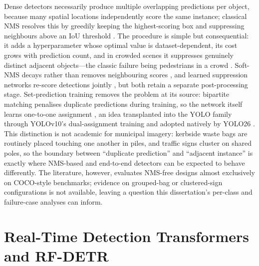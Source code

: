 Dense detectors necessarily produce multiple overlapping predictions per object, because many spatial locations independently score the same instance; classical NMS resolves this by greedily keeping the highest-scoring box and suppressing neighbours above an IoU threshold \citep{neubeck2006efficient}. The procedure is simple but consequential: it adds a hyperparameter whose optimal value is dataset-dependent, its cost grows with prediction count, and in crowded scenes it suppresses genuinely distinct adjacent objects---the classic failure being pedestrians in a crowd \citep{bodla2017soft}. Soft-NMS decays rather than removes neighbouring scores \citep{bodla2017soft}, and learned suppression networks re-score detections jointly \citep{hosang2017learning}, but both retain a separate post-processing stage. Set-prediction training removes the problem at its source: bipartite matching penalises duplicate predictions during training, so the network itself learns one-to-one assignment \citep{carion2020end}, an idea transplanted into the YOLO family through YOLOv10's dual-assignment training \citep{wang2024yolov10} and adopted natively by YOLO26 \citep{jocher2026yolo26}. This distinction is not academic for municipal imagery: kerbside waste bags are routinely placed touching one another in piles, and traffic signs cluster on shared poles, so the boundary between ``duplicate prediction'' and ``adjacent instance'' is exactly where NMS-based and end-to-end detectors can be expected to behave differently. The literature, however, evaluates NMS-free designs almost exclusively on COCO-style benchmarks; evidence on grouped-bag or clustered-sign configurations is not available, leaving a question this dissertation's per-class and failure-case analyses can inform.

\section{Real-Time Detection Transformers and RF-DETR}
\label{sec:lr-rfdetr}

